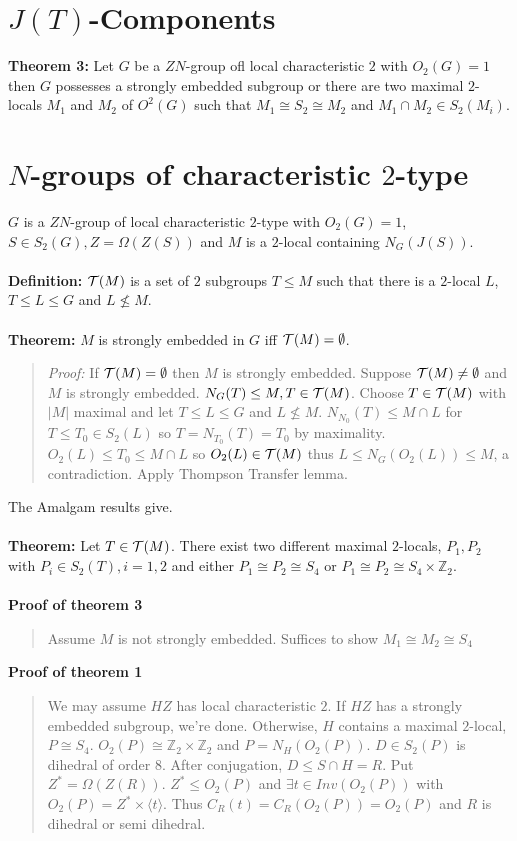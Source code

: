 \section{$J(T)$-Components}
{\bf Theorem 3:}  Let $G$ be a $ZN$-group ofl local characteristic $2$ with $O_2(G)=1$ then
$G$ possesses a strongly embedded subgroup or there are two maximal $2$-locals $M_1$ and $M_2$
of $O^2(G)$ such that $M_1 \cong S_2 \cong M_2$ and $M_1 \cap M_2 \in S_2(M_i)$.

\section{$N$-groups of characteristic $2$-type}
$G$ is a $ZN$-group of local characteristic $2$-type with $O_2(G)=1$, $S \in S_2(G), Z = \Omega(Z(S))$
and $M$ is a $2$-local containing $N_G(J(S))$.
\\
\\
{\bf Definition:}  ${\cal T}(M)$ is a set of $2$ subgroups $T \leq M$ such that
there is a $2$-local $L$, $T \leq L \leq G$ and $L \not\leq M$.
\\
\\
{\bf Theorem:} $M$ is strongly embedded in $G$ iff ${\cal T}(M)= \emptyset$.
\begin{quote}
\emph{Proof:} If ${\cal T}(M)= \emptyset$ then $M$ is strongly embedded.
Suppose ${\cal T}(M) \neq \emptyset$ and $M$ is strongly embedded.  $N_G(T) \leq M, T \in {\cal T}(M)$.
Choose $T \in {\cal T}(M)$ with $|M|$ maximal and let $T \leq L \leq G$ and $L \not\leq M$.
$N_{N_0}(T) \leq M \cap L$ for $T \leq T_0 \in S_2(L)$ so $T=N_{T_0}(T)=T_0$ by maximality.
$O_2(L) \leq T_0 \leq M \cap L$ so $O_2(L) \in {\cal T}(M)$ thus $L \leq N_G(O_2(L)) \leq M$, a contradiction.
Apply Thompson Transfer lemma.
\end{quote}
The Amalgam results give.\\
\\
{\bf Theorem:} Let $T \in {\cal T}(M)$.  There exist two different maximal $2$-locals, $P_1 , P_2$ with
$P_i \in S_2(T), i = 1, 2$ and either $P_1 \cong P_2 \cong S_4$ or $P_1 \cong P_2 \cong S_4 \times {\mathbb Z}_2$.
\\
\\
{\bf Proof of theorem 3}
\begin{quote}
Assume $M$ is not strongly embedded. Suffices to show $M_1 \cong M_2 \cong S_4$
\end{quote}
{\bf Proof of theorem 1}
\begin{quote}
We may assume $HZ$ has local characteristic $2$.  If $HZ$ has a strongly embedded subgroup, we're done.  Otherwise,
$H$ contains a maximal $2$-local, $P \cong S_4$.  $O_2(P) \cong {\mathbb Z}_2 \times {\mathbb Z}_2$ and $P= N_H(O_2(P))$.
$D \in S_2(P)$ is dihedral of order $8$.  After conjugation, $D \leq S \cap H = R$. Put $Z^*= \Omega(Z(R))$.
$Z^* \leq O_2(P)$ and $\exists t \in Inv(O_2(P))$ with $O_2(P) = Z^* \times \langle t \rangle$.  Thus
$C_R(t) = C_R(O_2(P)) = O_2(P)$ and $R$ is dihedral or semi dihedral.
\end{quote}
